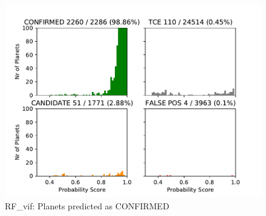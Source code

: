 
\begin{figure}[H]
                \begin{mdframed}[linecolor=green]
                \centering
                \includegraphics[width = 1\textwidth,height=.4\textheight]{data/RF_vif_pred_confirm.pdf}
                \caption{RF\_vif: Planets predicted as CONFIRMED}
                \label{fig:data/RF_vif_pred_confirm}
                \end{mdframed}
                \end{figure}